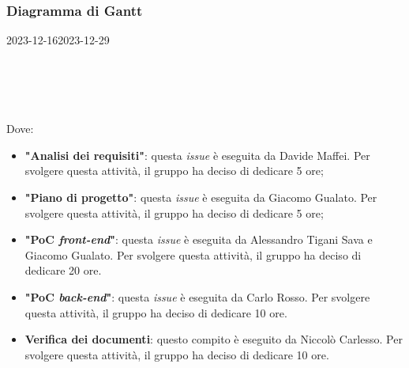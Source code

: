
\subsubsection{Diagramma di Gantt}

\begin{ganttchart}[
		x unit=0.6cm, %
		y unit chart=0.6cm,
		bar/.style={fill=blue!50},
		bar height=0.5,
		time slot format=isodate,
		time slot unit=day,
		vgrid,
		today=2023-12-16,
		today rule/.style={draw=red, ultra thick}
	]{2023-12-16}{2023-12-29}
	 \\
	 \\
	 \\
	 \\
	 \\
\end{ganttchart}

Dove:
\begin{itemize}
	\item \textbf{"Analisi dei requisiti"}: questa \textit{issue} è eseguita da
	      Davide Maffei. Per svolgere questa attività, il gruppo ha deciso di
	      dedicare 5 ore;

	\item \textbf{"Piano di progetto"}: questa \textit{issue} è eseguita da
	      Giacomo Gualato. Per svolgere questa attività, il gruppo ha deciso
	      di dedicare 5 ore;

	\item \textbf{"PoC \textit{front-end}"}: questa \textit{issue} è eseguita
	      da Alessandro Tigani Sava e Giacomo Gualato. Per svolgere questa
	      attività, il gruppo ha deciso di dedicare 20 ore.

	\item \textbf{"PoC \textit{back-end}"}: questa \textit{issue} è eseguita
	      da Carlo Rosso. Per svolgere questa attività, il gruppo ha deciso di
	      dedicare 10 ore.

	\item \textbf{Verifica dei documenti}: questo compito è eseguito da
	      Niccolò Carlesso. Per svolgere questa attività, il gruppo ha deciso
	      di dedicare 10 ore.
\end{itemize}


